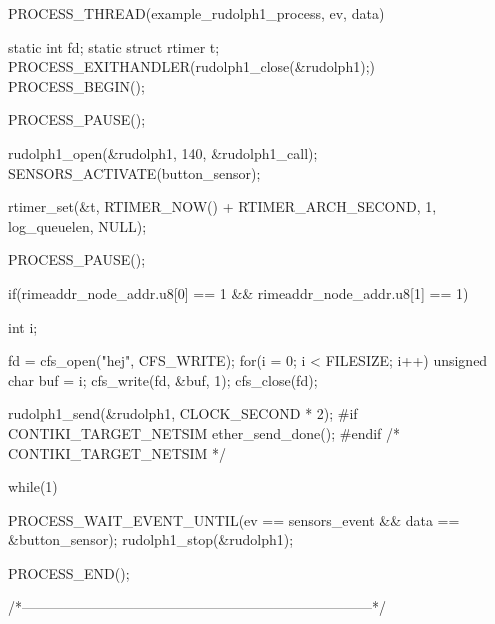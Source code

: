 \begin{DoxyCodeInclude}
PROCESS_THREAD(example_rudolph1_process, ev, data)
{
  static int fd;
  static struct rtimer t;
  PROCESS_EXITHANDLER(rudolph1_close(&rudolph1);)
  PROCESS_BEGIN();

  PROCESS_PAUSE();

  
  rudolph1_open(&rudolph1, 140, &rudolph1_call);
  SENSORS_ACTIVATE(button_sensor);

  rtimer_set(&t, RTIMER_NOW() + RTIMER_ARCH_SECOND, 1,
             log_queuelen, NULL);
  
  PROCESS_PAUSE();
  
  if(rimeaddr_node_addr.u8[0] == 1 &&
     rimeaddr_node_addr.u8[1] == 1) {
    {
      int i;
 
      fd = cfs_open("hej", CFS_WRITE);
      for(i = 0; i < FILESIZE; i++) {
        unsigned char buf = i;
        cfs_write(fd, &buf, 1);
      }
      cfs_close(fd);
    }
    rudolph1_send(&rudolph1, CLOCK_SECOND * 2);
#if CONTIKI_TARGET_NETSIM
    ether_send_done();
#endif /* CONTIKI_TARGET_NETSIM */

  }
  
  while(1) {

    PROCESS_WAIT_EVENT_UNTIL(ev == sensors_event &&
                             data == &button_sensor);
    rudolph1_stop(&rudolph1);

  }
  PROCESS_END();
}
/*---------------------------------------------------------------------------*/
\end{DoxyCodeInclude}
 